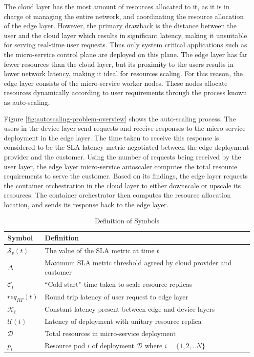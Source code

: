 The cloud layer has the most amount of resources allocated to it, as it is in charge of managing the entire network, and coordinating the resource allocation of the edge layer. However, the primary drawback is the distance between the user and the cloud layer which results in significant latency, making it unsuitable for serving real-time user requests. Thus only system critical applications such as the micro-service control plane are deployed on this plane. The edge layer has far fewer resources than the cloud layer, but its proximity to the users results in lower network latency, making it ideal for resources scaling. For this reason, the edge layer consists of the micro-service worker nodes. These nodes allocate resources dynamically according to user requirements through the process known as auto-scaling.\par

Figure \ref{fig:autoscaling-problem-overview} shows the auto-scaling process. The users in the device layer send requests and receive responses to the micro-service deployment in the edge layer. The time taken to receive this response is considered to be the SLA latency metric negotiated between the edge deployment provider and the customer. Using the number of requests being received by the user layer, the edge layer micro-service autoscaler computes the total resource requirements to serve the customer. Based on its findings, the edge layer requests the container orchestration in the cloud layer to either downscale or upscale its resources. The container orchestrator then computes the resource allocation location, and sends its response back to the edge layer.\par

\begin{table}
    \caption{Definition of Symbols}\label{tab:lstm-params}
    \centering
    \begin{tabular}{|l l|}
        \hline
        Symbol & Definition\\
        \hline
        $\mathcal{S}_{v}(t)$ & The value of the SLA metric at time $t$\\
        $\Delta$ & Maximum SLA metric threshold agreed by cloud provider and customer\\
        $\mathcal{C}_{t}$ & ``Cold start'' time taken to scale resource replicas\\
        $req_{RT}(t)$ & Round trip latency of user request to edge layer\\
        $\mathcal{K}_{t}$ & Constant latency present between edge and device layers\\
        $\mathcal{U}(t)$ & Latency of deployment with unitary resource replica\\
        $\mathcal{D}$ & Total resources in micro-service deployment\\
        $p_{i}$ & Resource pod $i$ of deployment $\mathcal{D}$ where $i = \{1, 2, .. N\}$\\
        \hline
    \end{tabular}
\end{table}

